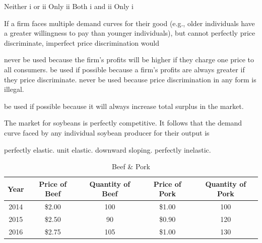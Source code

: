 \documentclass[addpoints,11pt]{exam}
\theoremstyle{definition}
\begin{document}
\begin{questions}
\begin{choices}
	\CorrectChoice Neither i or ii
	\choice Only ii
	\choice Both i and ii 
	\choice Only i
\end{choices}	





\question If a firm faces multiple demand curves for their good (e.g., older individuals have a greater willingness to pay than younger individuals), but cannot perfectly price discriminate, imperfect price discrimination would

\begin{choices}
	\choice never be used because the firm's profits will be higher if they charge one price to all consumers.
	\CorrectChoice be used if possible because a firm's profits are always greater if they price discriminate.
	\choice never be used because price discrimination in any form is illegal.
	\item be used if possible because it will always increase total surplus in the market.
\end{choices}


\question The market for soybeans is perfectly competitive. It follows that the demand curve faced by any individual soybean producer for their output is 

\begin{choices}
	\CorrectChoice perfectly elastic.
	\choice unit elastic.
	\choice downward sloping.
	\choice perfectly inelastic.
\end{choices}





\begin{table}[H]
	\centering
	\caption{Beef \& Pork}
	\label{tab5}
	\begin{tabular}{c|c|c|c|c}        
		
		Year & Price of Beef & Quantity of Beef & Price of Pork & Quantity of Pork \\
		\hline
		2014 & \$2.00 & 100  & \$1.00 & 100  \\
		2015 & \$2.50  & 90  & \$0.90 & 120  \\
		2016 & \$2.75  & 105  & \$1.00 & 130  \\
	\end{tabular}
\end{table}


\end{questions}
\end{document}
